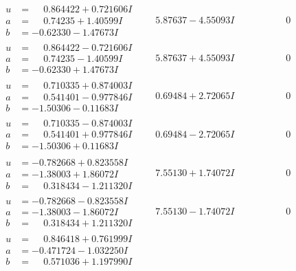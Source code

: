 \documentclass[1p]{elsarticle_modified}
\theoremstyle{definition}
\begin{document}
$$\begin{array}{c|c|c}
\begin{aligned}
u &= \phantom{-}0.864422 + 0.721606 I \\
a &= \phantom{-}0.74235 + 1.40599 I \\
b &= -0.62330 - 1.47673 I\end{aligned}
 & \phantom{-}5.87637 - 4.55093 I & \phantom{-0.000000 } 0 \\ \hline\begin{aligned}
u &= \phantom{-}0.864422 - 0.721606 I \\
a &= \phantom{-}0.74235 - 1.40599 I \\
b &= -0.62330 + 1.47673 I\end{aligned}
 & \phantom{-}5.87637 + 4.55093 I & \phantom{-0.000000 } 0 \\ \hline\begin{aligned}
u &= \phantom{-}0.710335 + 0.874003 I \\
a &= \phantom{-}0.541401 - 0.977846 I \\
b &= -1.50306 - 0.11683 I\end{aligned}
 & \phantom{-}0.69484 + 2.72065 I & \phantom{-0.000000 } 0 \\ \hline\begin{aligned}
u &= \phantom{-}0.710335 - 0.874003 I \\
a &= \phantom{-}0.541401 + 0.977846 I \\
b &= -1.50306 + 0.11683 I\end{aligned}
 & \phantom{-}0.69484 - 2.72065 I & \phantom{-0.000000 } 0 \\ \hline\begin{aligned}
u &= -0.782668 + 0.823558 I \\
a &= -1.38003 + 1.86072 I \\
b &= \phantom{-}0.318434 - 1.211320 I\end{aligned}
 & \phantom{-}7.55130 + 1.74072 I & \phantom{-0.000000 } 0 \\ \hline\begin{aligned}
u &= -0.782668 - 0.823558 I \\
a &= -1.38003 - 1.86072 I \\
b &= \phantom{-}0.318434 + 1.211320 I\end{aligned}
 & \phantom{-}7.55130 - 1.74072 I & \phantom{-0.000000 } 0 \\ \hline\begin{aligned}
u &= \phantom{-}0.846418 + 0.761999 I \\
a &= -0.471724 - 1.032250 I \\
b &= \phantom{-}0.571036 + 1.197990 I\end{aligned}

\end{array}$$
\end{document}
